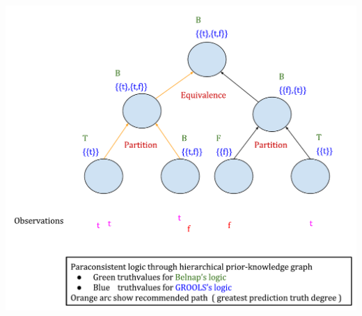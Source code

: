 \begin{refsegment}
\begin{shadedfigure}
    \centering
    \includegraphics[width=\textwidth]{img/GROOLS_vs_belnap_2.pdf}
    \caption{  }
    \label{fig:grools_belnap_2}
\end{shadedfigure}

\subbibliography
\end{refsegment}